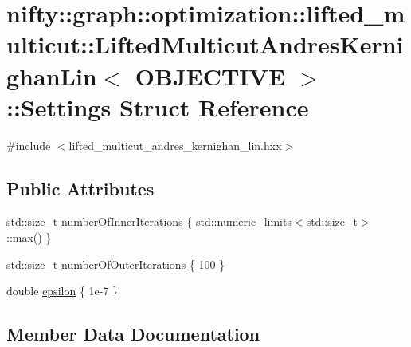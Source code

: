\hypertarget{structnifty_1_1graph_1_1optimization_1_1lifted__multicut_1_1LiftedMulticutAndresKernighanLin_1_1Settings}{}\section{nifty\+:\+:graph\+:\+:optimization\+:\+:lifted\+\_\+multicut\+:\+:Lifted\+Multicut\+Andres\+Kernighan\+Lin$<$ O\+B\+J\+E\+C\+T\+I\+V\+E $>$\+:\+:Settings Struct Reference}
\label{structnifty_1_1graph_1_1optimization_1_1lifted__multicut_1_1LiftedMulticutAndresKernighanLin_1_1Settings}


{\ttfamily \#include $<$lifted\+\_\+multicut\+\_\+andres\+\_\+kernighan\+\_\+lin.\+hxx$>$}

\subsection*{Public Attributes}
\begin{DoxyCompactItemize}
\item 
std\+::size\+\_\+t \hyperlink{structnifty_1_1graph_1_1optimization_1_1lifted__multicut_1_1LiftedMulticutAndresKernighanLin_1_1Settings_a53925e4cf4ab811b344bcc8535990a7d}{number\+Of\+Inner\+Iterations} \{ std\+::numeric\+\_\+limits$<$std\+::size\+\_\+t$>$\+::max() \}
\item 
std\+::size\+\_\+t \hyperlink{structnifty_1_1graph_1_1optimization_1_1lifted__multicut_1_1LiftedMulticutAndresKernighanLin_1_1Settings_a8ce28bc7fc269024e281eb77221130b1}{number\+Of\+Outer\+Iterations} \{ 100 \}
\item 
double \hyperlink{structnifty_1_1graph_1_1optimization_1_1lifted__multicut_1_1LiftedMulticutAndresKernighanLin_1_1Settings_a1a85a553f54d0699801591f2156b814b}{epsilon} \{ 1e-\/7 \}
\end{DoxyCompactItemize}


\subsection{Member Data Documentation}
\hypertarget{structnifty_1_1graph_1_1optimization_1_1lifted__multicut_1_1LiftedMulticutAndresKernighanLin_1_1Settings_a1a85a553f54d0699801591f2156b814b}{}
